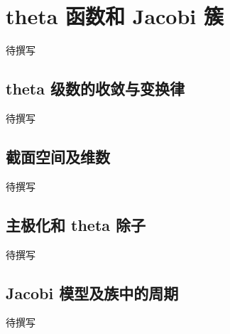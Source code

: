 
% 
% 
% 

\section{theta 函数和 Jacobi 簇}
\label{g4:sec:2104}

待撰写

\subsection{theta 级数的收敛与变换律}
\label{g4:subsec:2104:01}
待撰写

\subsection{截面空间及维数}
\label{g4:subsec:2104:02}
待撰写

\subsection{主极化和 theta 除子}
\label{g4:subsec:2104:03}
待撰写

\subsection{Jacobi 模型及族中的周期}
\label{g4:subsec:2104:04}
待撰写

